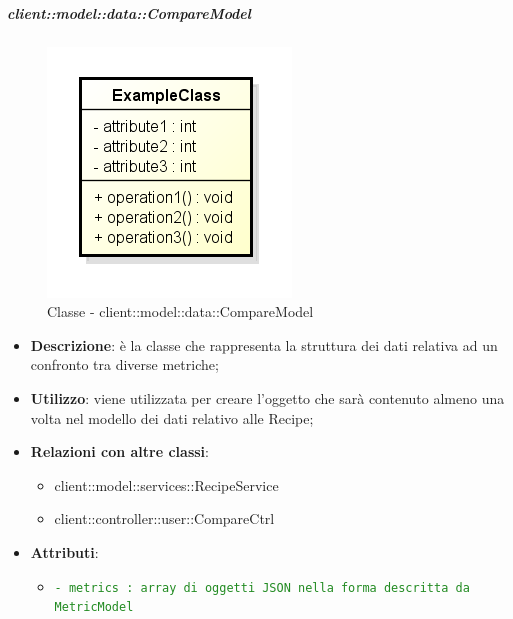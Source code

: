 
		\subparagraph{client::model::data::CompareModel} %
		\label{subp:client_model_data_comparemodel}
			\begin{figure}[htbp]
				\centering
				\centerline{\includegraphics[scale=0.7]{./images/client/classes/example_class.png}}
				\caption{Classe - client::model::data::CompareModel}
			\end{figure}
			\begin{itemize}
				\item \textbf{Descrizione}: è la classe che rappresenta la struttura dei dati relativa ad un confronto tra diverse metriche;
				\item \textbf{Utilizzo}: viene utilizzata per creare l'oggetto che sarà contenuto almeno una volta nel modello dei dati relativo alle Recipe;
				\item \textbf{Relazioni con altre classi}:
					\begin{itemize}
						\item client::model::services::RecipeService
						\item client::controller::user::CompareCtrl
					\end{itemize}
				\item \textbf{Attributi}:
					\begin{itemize}
						\item \textcolor{forestgreen}{\texttt{- metrics : array di oggetti JSON nella forma descritta da MetricModel}}
					\end{itemize}
			\end{itemize}


